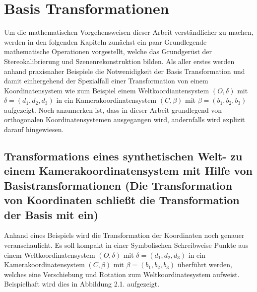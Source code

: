 \chapter{Basis Transformationen }

Um die mathematischen Vorgehensweisen dieser Arbeit verständlicher zu machen, werden in den folgenden Kapiteln zunächst ein paar Grundlegende mathematische Operationen vorgestellt, welche das Grundgerüst der Stereokalibrierung und Szenenrekonstruktion bilden. Als aller erstes werden anhand praxisnaher Beispiele die Notwenidigkeit der Basis Transformation und damit einhergehend der Spezialfall einer Transformation von einem Koordinatensystem wie zum Beispiel einem Weltkoordiantensystem $(O,\delta)$ mit $\delta=(d_1, d_2, d_3)$ in ein Kamerakoordinatensystem $(C,\beta)$ mit $\beta=(b_1,b_2,b_3)$ aufgezeigt. Noch anzumerken ist, dass in dieser Arbeit grundlegend von orthogonalen Koordinatensystemen ausgegangen wird, andernfalls wird explizit darauf hingewiesen. 



%
%

\section{Transformations eines synthetischen Welt- zu einem Kamerakoordinatensystem mit Hilfe von Basistransformationen (Die Transformation von Koordinaten schließt die Transformation der Basis mit ein)}

Anhand eines Beispiels wird die Transformation der Koordinaten noch genauer veranschaulicht. Es soll kompakt in einer Symbolischen Schreibweise Punkte aus einem Weltkoordinatensystem  
$(O,\delta)$ mit $\delta = (d_1,d_2,d_3)$ in ein Kamerakoordinatensystem  $(C,\beta)$ mit $\beta = (b_1,b_2,b_3)$ überführt werden, welches eine Verschiebung und Rotation zum Weltkoordinatesystem aufweist. Beispielhaft wird dies in Abbildung 2.1. aufgezeigt.
 
